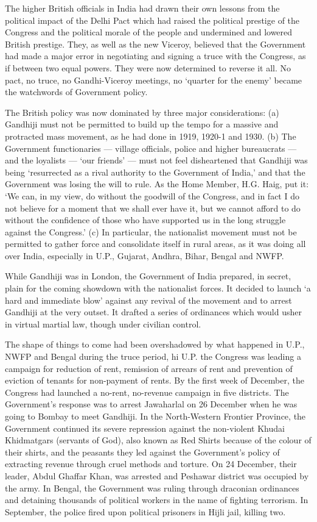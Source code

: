 The higher British officials in India had drawn their own lessons from the political impact of the Delhi Pact which had raised the political prestige of the Congress and the political morale of the people and undermined and lowered British prestige. They, as well as the new Viceroy, believed that the Government had made a major error in negotiating and signing a truce with the Congress, as if between two equal powers. They were now determined to reverse it all. No pact, no truce, no Gandhi-Viceroy meetings, no `quarter for the enemy' became the watchwords of Government policy. 

The British policy was now dominated by three major considerations: (a) Gandhiji must not be permitted to build up the tempo for a massive and protracted mass movement, as he had done in 1919, 1920-1 and 1930. (b) The Government functionaries — village officials, police and higher bureaucrats — and the loyalists — `our friends' — must not feel disheartened that Gandhiji was being `resurrected as a rival authority to the Government of India,' and that the Government was losing the will to rule. As the Home Member, H.G. Haig, put it: `We can, in my view, do without the goodwill of the Congress, and in fact I do not believe for a moment that we shall ever have it, but we cannot afford to do without the confidence of those who have supported us in the long struggle against the Congress.' (c) In particular, the nationalist movement must not be permitted to gather force and consolidate itself in rural areas, as it was doing all over India, especially in U.P., Gujarat, Andhra, Bihar, Bengal and NWFP. 

While Gandhiji was in London, the Government of India prepared, in secret, plain for the coming showdown with the nationalist forces. It decided to launch `a hard and immediate blow' against any revival of the movement and to arrest Gandhiji at the very outset. It drafted a series of ordinances which would usher in virtual martial law, though under civilian control. 

The shape of things to come had been overshadowed by what happened in U.P., NWFP and Bengal during the truce period, hi U.P. the Congress was leading a campaign for reduction of rent, remission of arrears of rent and prevention of eviction of tenants for non-payment of rents. By the first week of December, the Congress had launched a no-rent, no-revenue campaign in five districts. The Government's response was to arrest Jawaharlal on 26 December when he was going to Bombay to meet Gandhiji. In the North-Western Frontier Province, the Government continued its severe repression against the non-violent Khudai Khidmatgars (servants of God), also known as Red Shirts because of the colour of their shirts, and the peasants they led against the Government's policy of extracting revenue through cruel methods and torture. On 24 December, their leader, Abdul Ghaffar Khan, was arrested and Peshawar district was occupied by the army. In Bengal, the Government was ruling through draconian ordinances and detaining thousands of political workers in the name of fighting terrorism. In September, the police fired upon political prisoners in Hijli jail, killing two. 

